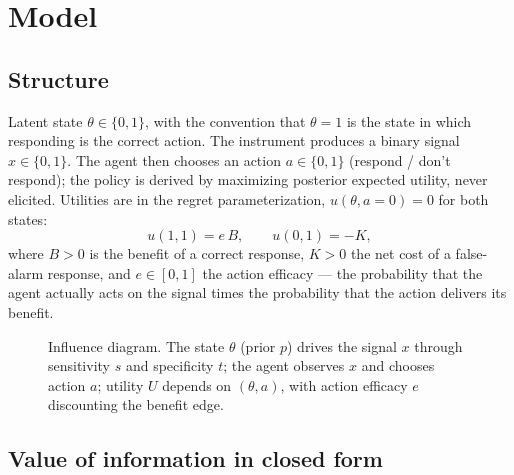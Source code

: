 \documentclass[11pt]{article}
\begin{document}
\section{Model}
\label{sec:model}

\subsection{Structure}

Latent state $\theta \in \{0,1\}$, with the convention that $\theta = 1$ is the
state in which responding is the correct action. The instrument produces a
binary signal $x \in \{0,1\}$. The agent then chooses an action
$a \in \{0,1\}$ (respond / don't respond); the policy is derived by maximizing
posterior expected utility, never elicited. Utilities are in the regret
parameterization, $u(\theta, a{=}0) = 0$ for both states:
\[
u(1,1) = e\,B, \qquad u(0,1) = -K,
\]
where $B > 0$ is the benefit of a correct response, $K > 0$ the net cost of a
false-alarm response, and $e \in [0,1]$ the action efficacy --- the probability
that the agent actually acts on the signal times the probability that the
action delivers its benefit.

\begin{figure}[ht]
\centering
{}
\caption{Influence diagram. The state $\theta$ (prior $p$) drives the signal
$x$ through sensitivity $s$ and specificity $t$; the agent observes $x$ and
chooses action $a$; utility $U$ depends on $(\theta, a)$, with action efficacy
$e$ discounting the benefit edge.}
\label{fig:influence}
\end{figure}

\subsection{Value of information in closed form}
\end{document}
